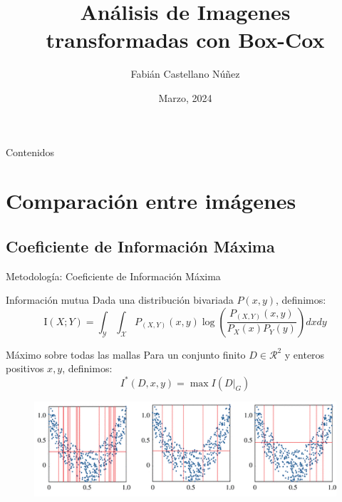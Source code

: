 \documentclass{beamer}
\title[Defensa de Memoria]{An\'alisis de Imagenes transformadas con
Box-Cox}
\author{Fabián Castellano Núñez}
\institute[Universidad Técnica Federico Santa María]
  {
  Profesor Guia: Ronny Vallejos A.
  }
\date{Marzo,  2024}
\begin{document}
\begin{frame}
  \titlepage
\end{frame}

\begin{frame}{Contenidos}
  \tableofcontents
\end{frame}





\section{Comparación entre imágenes}
\subsection{Coeficiente de Información Máxima}

\begin{frame}{Metodología: Coeficiente de Información Máxima}
    \pause
    
    \begin{block}{Información mutua}
    Dada una distribución bivariada $P(x,y)$, definimos:
        \begin{equation}\label{información mutua}
            \mathrm{I}(X ; Y)=\int_{\mathcal{Y}} \int_{\mathcal{X}} P_{(X, Y)}(x, y) \log \left(\frac{P_{(X, Y)}(x, y)}{P_{X}(x) P_{Y}(y)}\right)dxdy
        \end{equation}
    \end{block}
    \pause


    \begin{block}{Máximo sobre todas las mallas}
        Para un conjunto finito $D\in\mathcal{R}  ^2$ y enteros positivos $x,y$, definimos:
		$$
		I^*(D,x,y)=\max I(D|_G)
		$$
    \end{block}
    \begin{figure}
        \centering
        \includegraphics[scale=0.6] {rsos201424f03.png}
        \label{fig:my_label}
    \end{figure}
\end{frame}
\end{document}
